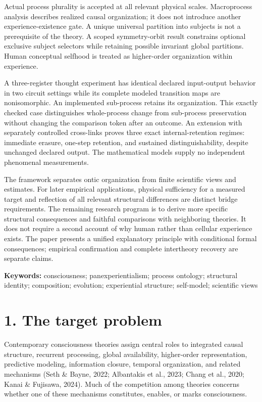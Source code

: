\documentclass[
  11pt,
  a4paper,
]{article}
\begin{document}
Actual process plurality is accepted at all relevant physical scales.
Macroprocess analysis describes realized causal organization; it does
not introduce another experience-existence gate. A unique universal
partition into subjects is not a prerequisite of the theory. A scoped
symmetry-orbit result constrains optional exclusive subject selectors
while retaining possible invariant global partitions. Human conceptual
selfhood is treated as higher-order organization within experience.

A three-register thought experiment has identical declared input-output
behavior in two circuit settings while its complete modeled transition
maps are nonisomorphic. An implemented sub-process retains its
organization. This exactly checked case distinguishes whole-process
change from sub-process preservation without changing the comparison
token after an outcome. An extension with separately controlled
cross-links proves three exact internal-retention regimes: immediate
erasure, one-step retention, and sustained distinguishability, despite
unchanged declared output. The mathematical models supply no independent
phenomenal measurements.

The framework separates ontic organization from finite scientific views
and estimates. For later empirical applications, physical sufficiency
for a measured target and reflection of all relevant structural
differences are distinct bridge requirements. The remaining research
program is to derive more specific structural consequences and faithful
comparisons with neighboring theories. It does not require a second
account of why human rather than cellular experience exists. The paper
presents a unified explanatory principle with conditional formal
consequences; empirical confirmation and complete intertheory recovery
are separate claims.

\textbf{Keywords:} consciousness; panexperientialism; process ontology;
structural identity; composition; evolution; experiential structure;
self-model; scientific views

\hypertarget{the-target-problem}{%
\section{1. The target problem}\label{the-target-problem}}

Contemporary consciousness theories assign central roles to integrated
causal structure, recurrent processing, global availability,
higher-order representation, predictive modeling, information closure,
temporal organization, and related mechanisms (Seth \& Bayne, 2022;
Albantakis et al., 2023; Chang et al., 2020; Kanai \& Fujisawa, 2024).
Much of the competition among theories concerns whether one of these
mechanisms constitutes, enables, or marks consciousness.
\end{document}
